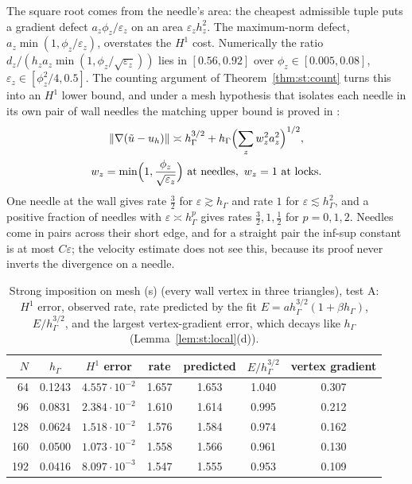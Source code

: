 \documentclass[pdflatex,sn-mathphys-num]{sn-jnl}
\theoremstyle{thmstyleone}
\theoremstyle{thmstylethree}
\newcommand{\hG}{h_\Gamma}
\newcommand{\ut}{\tilde u}
\newcommand{\norm}[1]{\lVert #1\rVert}
\begin{document}
The square root comes from the needle's area: the cheapest admissible tuple puts a gradient defect $a_z\phi_z/\varepsilon_z$ on an area $\varepsilon_zh_z^2$. The maximum-norm defect, $a_z\min(1,\phi_z/\varepsilon_z)$, overstates the $H^1$ cost. Numerically the ratio $d_z/(h_za_z\min(1,\phi_z/\sqrt{\varepsilon_z}))$ lies in $[0.56,0.92]$ over $\phi_z\in[0.005,0.08]$, $\varepsilon_z\in[\phi_z^2/4,0.5]$. The counting argument of Theorem~\ref{thm:st:count} turns this into an $H^1$ lower bound, and under a mesh hypothesis that isolates each needle in its own pair of wall needles the matching upper bound is proved in \cite{PadhiExt}:
\begin{gather*}
\norm{\nabla(\ut-u_h)}\asymp\hG^{3/2}+\hG\Bigl(\sum_zw_z^2a_z^2\Bigr)^{1/2},\\
w_z=\min\Bigl(1,\frac{\phi_z}{\sqrt{\varepsilon_z}}\Bigr)\ \text{at needles},\ w_z=1\ \text{at locks}.
\end{gather*}
One needle at the wall gives rate $\frac32$ for $\varepsilon\gtrsim\hG$ and rate $1$ for $\varepsilon\lesssim\hG^2$, and a positive fraction of needles with $\varepsilon\asymp\hG^p$ gives rates $\frac32,1,\frac12$ for $p=0,1,2$. Needles come in pairs across their short edge, and for a straight pair the inf-sup constant is at most $C\varepsilon$; the velocity estimate does not see this, because its proof never inverts the divergence on a needle.

\begin{table}[t]
\centering\small
\caption{Strong imposition on mesh (s) (every wall vertex in three triangles), test A: $H^1$ error, observed rate, rate predicted by the fit $E=a\hG^{3/2}(1+\beta\hG)$, $E/\hG^{3/2}$, and the largest vertex-gradient error, which decays like $\hG$ (Lemma~\ref{lem:st:local}(d)).}\label{tab:drift}
\begin{tabular}{rcccccc}
\toprule
$N$ & $\hG$ & $H^1$ error & rate & predicted & $E/\hG^{3/2}$ & vertex gradient\\
\midrule
64 & 0.1243 & $4.557\cdot10^{-2}$ & 1.657 & 1.653 & 1.040 & 0.307\\
96 & 0.0831 & $2.384\cdot10^{-2}$ & 1.610 & 1.614 & 0.995 & 0.212\\
128 & 0.0624 & $1.518\cdot10^{-2}$ & 1.576 & 1.584 & 0.974 & 0.162\\
160 & 0.0500 & $1.073\cdot10^{-2}$ & 1.558 & 1.566 & 0.961 & 0.130\\
192 & 0.0416 & $8.097\cdot10^{-3}$ & 1.547 & 1.555 & 0.953 & 0.109\\
\bottomrule
\end{tabular}
\end{table}
\end{document}
